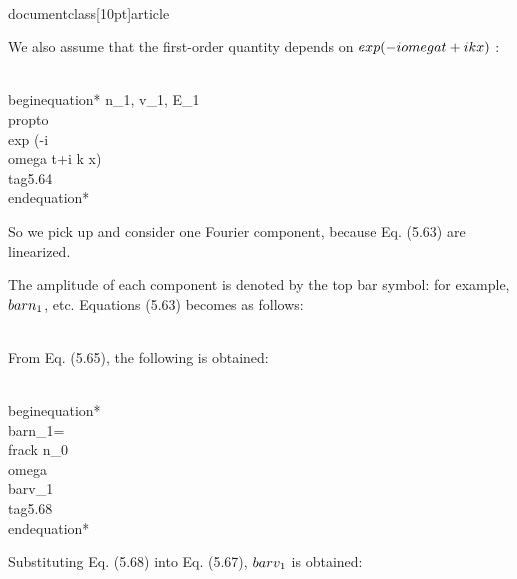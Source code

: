 \\documentclass[10pt]{article}
\begin{document}
{{{We also assume that the first-order quantity depends on $\\exp (-i \\omega t+i k x)$ :


\\begin{equation*}
n_{1}, v_{1}, E_{1} \\propto \\exp (-i \\omega t+i k x) \\tag{5.64}
\\end{equation*}


So we pick up and consider one Fourier component, because Eq. (5.63) are linearized.

The amplitude of each component is denoted by the top bar symbol: for example, $\\bar{n}_{1}$, etc. Equations (5.63) becomes as follows:

\\[
\\begin{array}{r}
-i \\omega \\bar{n}_{1}+i k n_{0} \\bar{v}_{1}=0 \\\\
-i \\omega m_{e} n_{0} \\bar{v}_{1}=-e n_{0} \\bar{E}_{1}-i k \\gamma T_{0} \\bar{n}_{1} \\\\
i k \\bar{E}_{1}=-\\frac{1}{\\varepsilon_{0}} e \\bar{n}_{1} \\tag{5.67}
\\end{array}
\\]

From Eq. (5.65), the following is obtained:


\\begin{equation*}
\\bar{n}_{1}=\\frac{k n_{0}}{\\omega} \\bar{v}_{1} \\tag{5.68}
\\end{equation*}


Substituting Eq. (5.68) into Eq. (5.67), $\\bar{v}_{1}$ is obtained:


}}}
\end{document}
